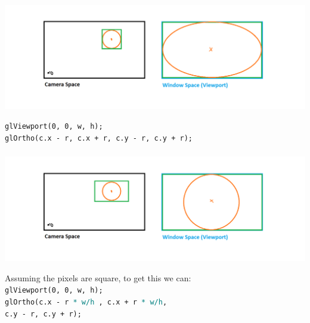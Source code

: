 \documentclass{beamer}
\begin{document}
\begin{frame}
    \frametitle{}

    \begin{center}
        \includegraphics[scale=0.4]{q7-cam-win-1.png}
    \end{center}

    \begin{tcolorbox}
        \small
        \texttt{glViewport(0, 0, w, h);}\\
        \texttt{glOrtho(c.x - r, c.x + r, c.y - r, c.y + r);}
    \end{tcolorbox}

\end{frame}

\begin{frame}
    \frametitle{}

    \begin{center}
        \includegraphics[scale=0.4]{q7-cam-win-2.png}
    \end{center}

    \begin{tcolorbox}
        \small
        Assuming the pixels are square, to get this we can:\\
        \texttt{glViewport(0, 0, w, h);}\\
        \texttt{glOrtho(c.x - r \textcolor{teal}{* w/h} , c.x + r \textcolor{teal}{* w/h}, \\
            c.y - r, c.y + r);}
    \end{tcolorbox}

\end{frame}
\end{document}
